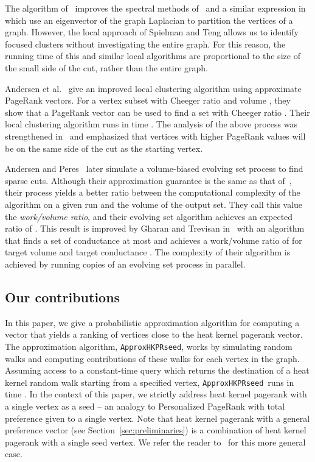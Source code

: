 \documentclass[runningheads,a4paper]{llncs}
\newcommand{\hkprseedalg}{\texttt{ApproxHKPRseed}}
\begin{document}
The algorithm of~\cite{st:graphpartitioning:stoc04,st:localcluster:08} improves
the spectral methods of~\cite{donath1972algorithms} and a similar expression
in~\cite{aloniso85} which use an eigenvector of the graph Laplacian to partition
the vertices of a graph.  However, the local approach of Spielman and Teng
allows us to identify focused clusters without investigating the entire graph.
For this reason, the running time of this and similar local algorithms are
proportional to the size of the small side of the cut, rather than the entire
graph.

Andersen et al.~\cite{acl:prgraphpartition:focs06} give an improved local
clustering algorithm using approximate PageRank vectors.  For a vertex subset
 with Cheeger ratio  and volume , they show that a PageRank vector
can be used to find a set with Cheeger ratio .  Their
local clustering algorithm runs in time .  The analysis
of the above process was strengthened in~\cite{ac:sharpdrops:07} and emphasized
that vertices with higher PageRank values will be on the same side of the cut as
the starting vertex.

Andersen and Peres~\cite{ap:evolving:09} later simulate a volume-biased evolving
set process to find sparse cuts.  Although their approximation guarantee is the
same as that of~\cite{acl:prgraphpartition:focs06}, their process yields a
better ratio between the computational complexity of the algorithm on a given
run and the volume of the output set.  They call this value the
\emph{work/volume ratio}, and their evolving set algorithm achieves an expected
ratio of .  This result is improved by Gharan and
Trevisan in~\cite{gt:optimalcluster:12} with an algorithm that finds a set of
conductance at most  and achieves a work/volume
ratio of  for target volume
 and target conductance .  The complexity of their algorithm is
achieved by running copies of an evolving set process in parallel.

\subsection{Our contributions}
In this paper, we give a probabilistic approximation algorithm for computing a
vector that yields a ranking of vertices close to the heat kernel pagerank
vector.  The approximation algorithm, \hkprseedalg, works by simulating random
walks and computing contributions of these walks for each vertex in the graph.
Assuming access to a constant-time query which returns the destination of a heat
kernel random walk starting from a specified vertex, \hkprseedalg~runs in time
. In the context of this paper, we strictly address heat kernel
pagerank with a single vertex as a seed -- an analogy to Personalized PageRank
with total preference given to a single vertex.  Note that heat kernel pagerank
with a general preference vector (see Section~\ref{sec:preliminaries}) is a
combination of heat kernel pagerank with a single seed vertex.  We refer the
reader to~\cite{cs:imlinear:14} for this more general case.
\end{document}
